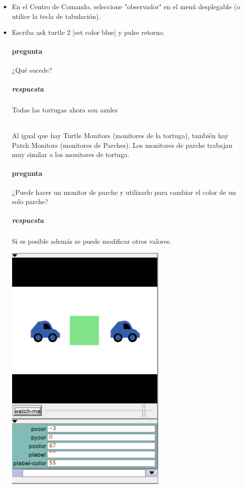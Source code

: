 \documentclass[12pt,letterpaper]{article}
\begin{document}
\begin{itemize}
\item En el Centro de Comando, seleccione "observador" en el menú desplegable (o utilice la tecla de tabulación).

\item Escriba ask turtle 2 [set color blue] y pulse retorno.
\paragraph{pregunta}¿Qué sucede?
\subparagraph{respuesta}Todas las tortugas ahora son azules

\hfill \\

Al igual que hay Turtle Monitors (monitores de la tortuga), también hay Patch Monitors (monitores de Parches). Los monitores de parche trabajan muy similar a los monitores de tortuga.

\paragraph{pregunta}¿Puede hacer un monitor de parche y utilizarlo para cambiar el color de un solo parche?
\subparagraph{respuesta}Si es posible además se puede modificar otros valores.

\begin{center}
	\includegraphics[width=8cm]{./imagenes/image11.png}
\end{center}


\end{itemize}
\end{document}
